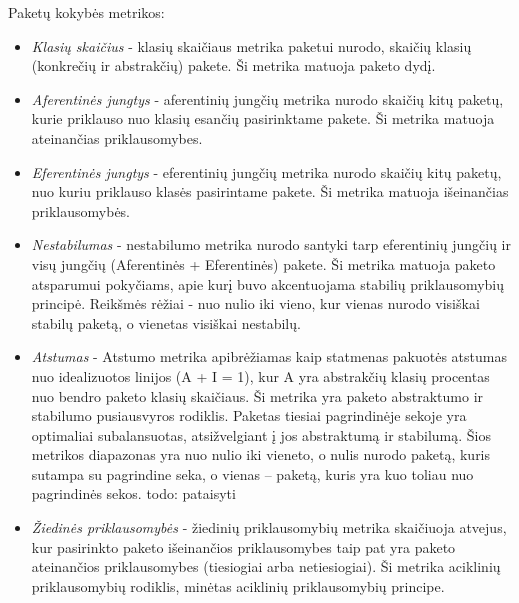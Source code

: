 Paketų kokybės metrikos:
\begin{itemize}
    \item \textit{Klasių skaičius} - klasių skaičiaus metrika paketui nurodo, skaičių klasių (konkrečių ir abstrakčių) pakete.
    Ši metrika matuoja paketo dydį.
    \item \textit{Aferentinės jungtys } - aferentinių jungčių metrika nurodo
    skaičių kitų paketų, kurie priklauso nuo klasių esančių pasirinktame pakete.
    Ši metrika matuoja ateinančias priklausomybes.
    \item \textit{Eferentinės jungtys } - eferentinių jungčių metrika nurodo skaičių kitų paketų,
    nuo kuriu priklauso klasės pasirintame pakete.
    Ši metrika matuoja išeinančias priklausomybės.
    \item \textit{Nestabilumas} - nestabilumo metrika nurodo santyki tarp eferentinių jungčių ir
    visų jungčių (Aferentinės + Eferentinės) pakete.
    Ši metrika matuoja paketo atsparumui pokyčiams, apie kurį buvo akcentuojama stabilių priklausomybių principė.
    Reikšmės rėžiai - nuo nulio iki vieno, kur vienas nurodo visiškai stabilų paketą, o vienetas visiškai nestabilų.
    \item \textit{Atstumas} - Atstumo metrika apibrėžiamas kaip statmenas pakuotės atstumas nuo idealizuotos linijos (A + I = 1),
    kur A yra abstrakčių klasių procentas nuo bendro paketo klasių skaičiaus.
    Ši metrika yra paketo abstraktumo ir stabilumo pusiausvyros rodiklis.
    Paketas tiesiai pagrindinėje sekoje yra optimaliai subalansuotas, atsižvelgiant į jos abstraktumą ir stabilumą.
    Šios metrikos diapazonas yra nuo nulio iki vieneto, o nulis nurodo paketą, kuris sutampa su pagrindine seka,
    o vienas – paketą, kuris yra kuo toliau nuo pagrindinės sekos. todo: pataisyti
    \item \textit{Žiedinės priklausomybės} - žiedinių priklausomybių metrika skaičiuoja atvejus,
    kur pasirinkto paketo išeinančios priklausomybes taip pat yra paketo ateinančios priklausomybes (tiesiogiai arba netiesiogiai).
    Ši metrika aciklinių priklausomybių rodiklis, minėtas aciklinių priklausomybių principe.
\end{itemize}